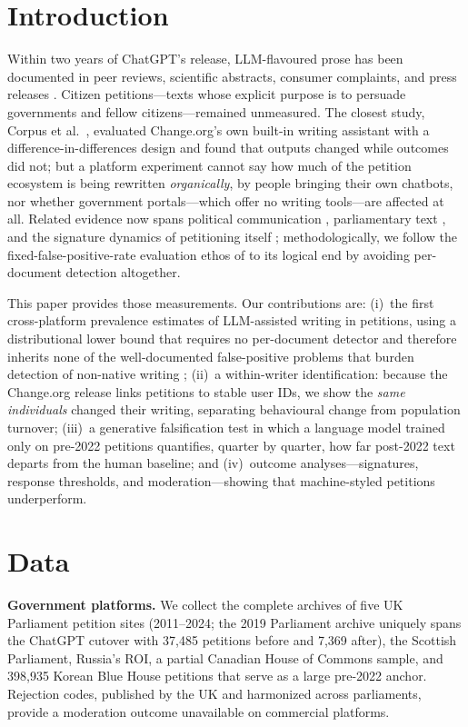 \documentclass[10pt,twocolumn]{article}
\begin{document}
\section{Introduction}
Within two years of ChatGPT's release, LLM-flavoured prose has been documented in peer reviews, scientific abstracts, consumer complaints, and press releases \cite{liang2024monitoring,liang2025quantifying,kobak2025delving,patterns2025complaints}. Citizen petitions---texts whose explicit purpose is to persuade governments and fellow citizens---remained unmeasured. The closest study, Corpus et al.\ \cite{corpus2026introducing}, evaluated Change.org's own built-in writing assistant with a difference-in-differences design and found that outputs changed while outcomes did not; but a platform experiment cannot say how much of the petition ecosystem is being rewritten \emph{organically}, by people bringing their own chatbots, nor whether government portals---which offer no writing tools---are affected at all. Related evidence now spans political communication \cite{russo2025llm}, parliamentary text \cite{suvanto2026parl}, and the signature dynamics of petitioning itself \cite{yasseri2017rapid}; methodologically, we follow the fixed-false-positive-rate evaluation ethos of \cite{dugan2024raid} to its logical end by avoiding per-document detection altogether.

This paper provides those measurements. Our contributions are: (i)~the first cross-platform prevalence estimates of LLM-assisted writing in petitions, using a distributional lower bound that requires no per-document detector and therefore inherits none of the well-documented false-positive problems that burden detection of non-native writing \cite{liang2023gpt}; (ii)~a within-writer identification: because the Change.org release links petitions to stable user IDs, we show the \emph{same individuals} changed their writing, separating behavioural change from population turnover; (iii)~a generative falsification test in which a language model trained only on pre-2022 petitions quantifies, quarter by quarter, how far post-2022 text departs from the human baseline; and (iv)~outcome analyses---signatures, response thresholds, and moderation---showing that machine-styled petitions underperform.

\section{Data}
\textbf{Government platforms.} We collect the complete archives of five UK Parliament petition sites (2011--2024; the 2019 Parliament archive uniquely spans the ChatGPT cutover with 37{,}485 petitions before and 7{,}369 after), the Scottish Parliament, Russia's ROI, a partial Canadian House of Commons sample, and 398{,}935 Korean Blue House petitions that serve as a large pre-2022 anchor. Rejection codes, published by the UK and harmonized across parliaments, provide a moderation outcome unavailable on commercial platforms.
\end{document}
